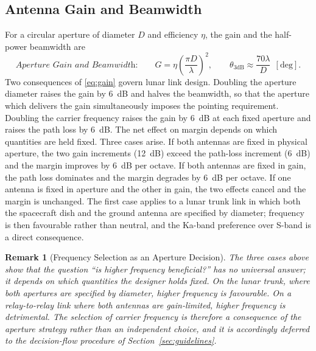 \documentclass[11pt,a4paper]{article}
\newtheorem{remark}{Remark}
\begin{document}
\subsection{Antenna Gain and Beamwidth}
For a circular aperture of diameter $D$ and efficiency $\eta$, the gain and the half-power beamwidth are
\begin{equation}
\label{eq:gain}
\textit{Aperture Gain and Beamwidth:}\qquad
G = \eta \left(\frac{\pi D}{\lambda}\right)^{2}, \qquad \theta_{3\mathrm{dB}} \approx \frac{70\lambda}{D} \ \ [\mathrm{deg}].
\end{equation}
Two consequences of \eqref{eq:gain} govern lunar link design. Doubling the aperture diameter raises the gain by \SI{6}{dB} and halves the beamwidth, so that the aperture which delivers the gain simultaneously imposes the pointing requirement. Doubling the carrier frequency raises the gain by \SI{6}{dB} at each fixed aperture and raises the path loss by \SI{6}{dB}. The net effect on margin depends on which quantities are held fixed. Three cases arise. If both antennas are fixed in physical aperture, the two gain increments (\SI{12}{dB}) exceed the path-loss increment (\SI{6}{dB}) and the margin improves by \SI{6}{dB} per octave. If both antennas are fixed in gain, the path loss dominates and the margin degrades by \SI{6}{dB} per octave. If one antenna is fixed in aperture and the other in gain, the two effects cancel and the margin is unchanged. The first case applies to a lunar trunk link in which both the spacecraft dish and the ground antenna are specified by diameter; frequency is then favourable rather than neutral, and the Ka-band preference over S-band is a direct consequence.

\begin{remark}[Frequency Selection as an Aperture Decision]
\label{rem:freq}
The three cases above show that the question ``is higher frequency beneficial?'' has no universal answer; it depends on which quantities the designer holds fixed. On the lunar trunk, where both apertures are specified by diameter, higher frequency is favourable. On a relay-to-relay link where both antennas are gain-limited, higher frequency is detrimental. The selection of carrier frequency is therefore a consequence of the aperture strategy rather than an independent choice, and it is accordingly deferred to the decision-flow procedure of Section~\ref{sec:guidelines}.
\end{remark}
\end{document}

